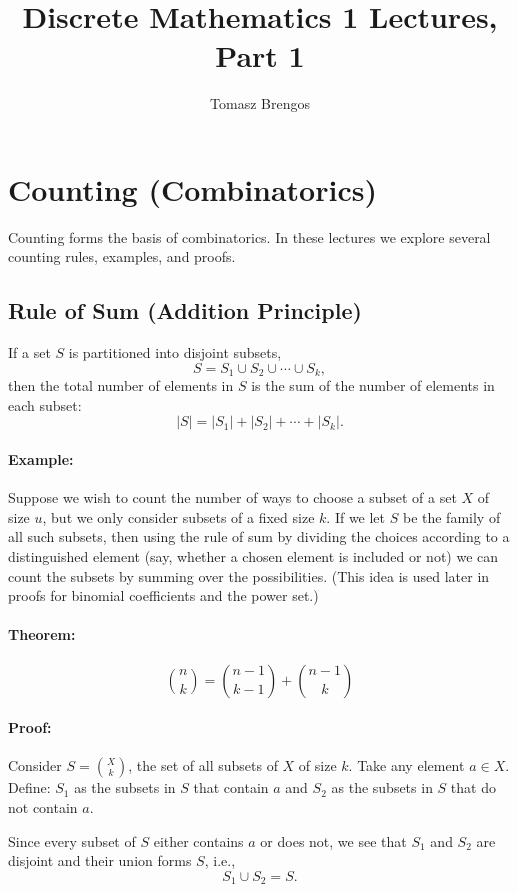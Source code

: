 \documentclass{article}
\title{Discrete Mathematics 1 Lectures, Part 1}
\author{Tomasz Brengos}
\date{}
\begin{document}
\maketitle

\section{Counting (Combinatorics)}

Counting forms the basis of combinatorics. In these lectures we explore several counting rules, examples, and proofs.

\subsection{Rule of Sum (Addition Principle)}
If a set $S$ is partitioned into disjoint subsets,
\[
S = S_1 \cup S_2 \cup \cdots \cup S_k,
\]
then the total number of elements in $S$ is the sum of the number of elements in each subset:
\[
|S| = |S_1| + |S_2| + \cdots + |S_k|.
\]

\paragraph{Example:}  
Suppose we wish to count the number of ways to choose a subset of a set $X$ of size $u$, but we only consider subsets of a fixed size $k$. If we let $S$ be the family of all such subsets, then using the rule of sum by dividing the choices according to a distinguished element (say, whether a chosen element is included or not) we can count the subsets by summing over the possibilities. (This idea is used later in proofs for binomial coefficients and the power set.)

\paragraph{Theorem:}
\[
\binom{n}{k} = \binom{n-1}{k-1} + \binom{n-1}{k}
\]

\paragraph{Proof:}
Consider \( S = \binom{X}{k} \), the set of all subsets of \( X \) of size \( k \).  
Take any element \( a \in X \). Define:  
 \( S_1 \) as the subsets in \( S \) that contain \( a \) and  
 \( S_2 \) as the subsets in \( S \) that do not contain \( a \).  

Since every subset of \( S \) either contains \( a \) or does not, we see that \( S_1 \) and \( S_2 \) are disjoint and their union forms \( S \), i.e.,  
\[
S_1 \cup S_2 = S.
\]
\end{document}
